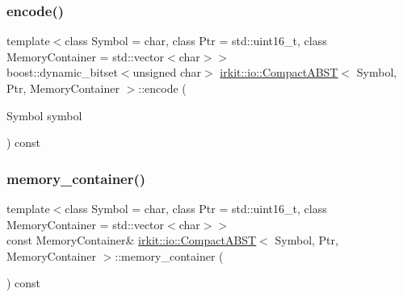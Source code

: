 \mbox{\label{classirkit_1_1io_1_1CompactABST_ab959f87690a55266eb838102ba93665b}} 
\subsubsection{\texorpdfstring{encode()}{encode()}\hspace{0.1cm}{\footnotesize\ttfamily [3/3]}}
{\footnotesize\ttfamily template$<$class Symbol = char, class Ptr = std\+::uint16\+\_\+t, class Memory\+Container = std\+::vector$<$char$>$$>$ \\
boost\+::dynamic\+\_\+bitset$<$unsigned char$>$ \mbox{\hyperlink{classirkit_1_1io_1_1CompactABST}{irkit\+::io\+::\+Compact\+A\+B\+ST}}$<$ Symbol, Ptr, Memory\+Container $>$\+::encode (\begin{DoxyParamCaption}\item[{Symbol}]{symbol }\end{DoxyParamCaption}) const\hspace{0.3cm}{\ttfamily [inline]}}

\mbox{\label{classirkit_1_1io_1_1CompactABST_a6c0944a0683df43e03f6faec67d3d719}} 
\subsubsection{\texorpdfstring{memory\+\_\+container()}{memory\_container()}}
{\footnotesize\ttfamily template$<$class Symbol = char, class Ptr = std\+::uint16\+\_\+t, class Memory\+Container = std\+::vector$<$char$>$$>$ \\
const Memory\+Container\& \mbox{\hyperlink{classirkit_1_1io_1_1CompactABST}{irkit\+::io\+::\+Compact\+A\+B\+ST}}$<$ Symbol, Ptr, Memory\+Container $>$\+::memory\+\_\+container (\begin{DoxyParamCaption}{ }\end{DoxyParamCaption}) const\hspace{0.3cm}{\ttfamily [inline]}}

